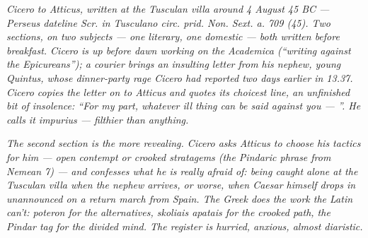 
\textit{Cicero to Atticus, written at the Tusculan villa around 4
August 45 BC --- Perseus dateline \textit{Scr. in Tusculano
circ. prid. Non. Sext. a. 709 (45)}. Two sections, on two
subjects --- one literary, one domestic --- both written before
breakfast. Cicero is up before dawn working on the
\textit{Academica} (``writing against the Epicureans''); a
courier brings an insulting letter from his nephew, young
Quintus, whose dinner-party rage Cicero had reported two days
earlier in 13.37. Cicero copies the letter on to Atticus and
quotes its choicest line, an unfinished bit of insolence: ``For
my part, whatever ill thing can be said against you --- ''. He
calls it \textit{impurius} --- filthier than anything.}

\textit{The second section is the more revealing. Cicero asks
Atticus to choose his tactics for him --- open contempt or
\textit{crooked stratagems} (the Pindaric phrase from
\textit{Nemean} 7) --- and confesses what he is really afraid of:
being caught alone at the Tusculan villa when the nephew arrives,
or worse, when Caesar himself drops in unannounced on a return
march from Spain. The Greek does the work the Latin can't:
\textit{poteron} for the alternatives, \textit{skoliais apatais}
for the crooked path, the Pindar tag for the divided mind.
The register is hurried, anxious, almost diaristic.}
